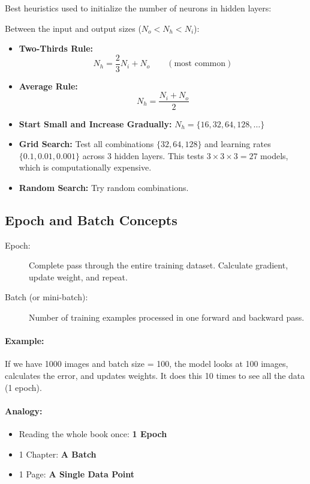 Best heuristics used to initialize the number of neurons in hidden layers:

Between the input and output sizes ($N_o < N_h < N_i$):
\begin{itemize}
    \item \textbf{Two-Thirds Rule:}
    \begin{equation}
    N_h = \frac{2}{3} N_i + N_o \qquad (\text{most common})
    \end{equation}
    \item \textbf{Average Rule:}
    \begin{equation}
    N_h = \frac{N_i + N_o}{2}
    \end{equation}
    \item \textbf{Start Small and Increase Gradually:} $N_h = \{16, 32, 64, 128, \dots\}$
    \item \textbf{Grid Search:} Test all combinations $\{32, 64, 128\}$ and learning rates $\{0.1, 0.01, 0.001\}$ across 3 hidden layers. This tests $3 \times 3 \times 3 = 27$ models, which is computationally expensive.
    \item \textbf{Random Search:} Try random combinations.
\end{itemize}

\subsection{Epoch and Batch Concepts}

\begin{description}
    \item[Epoch:] Complete pass through the entire training dataset. Calculate gradient, update weight, and repeat.
    \item[Batch (or mini-batch):] Number of training examples processed in one forward and backward pass.
\end{description}

\paragraph{Example:} If we have 1000 images and batch size = 100, the model looks at 100 images, calculates the error, and updates weights. It does this 10 times to see all the data (1 epoch).

\paragraph{Analogy:}
\begin{itemize}
    \item Reading the whole book once: \textbf{1 Epoch}
    \item 1 Chapter: \textbf{A Batch}
    \item 1 Page: \textbf{A Single Data Point}
\end{itemize}

